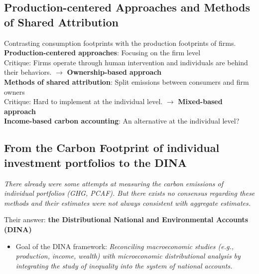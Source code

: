 \documentclass[10pt]{beamer}
\begin{document}
\subsection{Production-centered Approaches and Methods of Shared Attribution}
\begin{frame}{\subsecname}
    Contrasting consumption footprints with the production footprints of firms. \\
    \hfill \break
    \textbf{Production-centered approaches}: Focusing on the firm level \\
    Critique: Firms operate through human intervention and individuals are behind their behaviors. $\rightarrow$ \textbf{Ownership-based approach} \\
    \hfill \break
    \textbf{Methods of shared attribution}: Split emissions between consumers and firm owners \\
    Critique: Hard to implement at the individual level. $\rightarrow$ \textbf{Mixed-based approach} \\
    \hfill \break
    \textbf{Income-based carbon accounting}: An alternative at the individual level?
\end{frame}

\subsection{From the Carbon Footprint of individual investment portfolios to the DINA}
\begin{frame}{\subsecname}
    \textit{There already were some attempts at measuring the carbon emissions of individual portfolios (GHG, PCAF). But there exists no consensus regarding these methods and their estimates were not always consistent with aggregate estimates.}
    \vspace{15pt}
    
    Their answer:
    \textbf{the Distributional National and Environmental Accounts (DINA)}
    \begin{itemize}
        \item Goal of the DINA framework: \textit{Reconciling macroeconomic studies (e.g., production, income, wealth) with microeconomic distributional analysis by integrating the study of inequality into the system of national accounts. }
    \end{itemize}
\end{frame}
\end{document}
